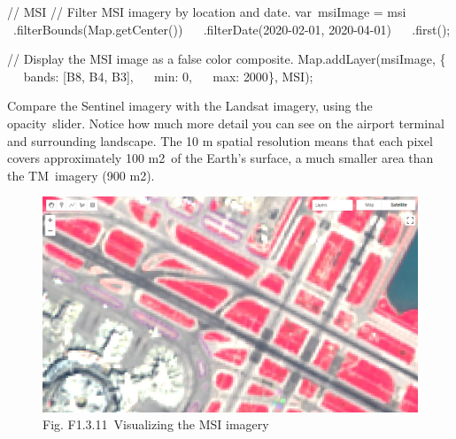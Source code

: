 \documentclass[
  letterpaper,
  DIV=11,
  numbers=noendperiod]{scrreprt}
\newenvironment{Shaded}{\begin{snugshade}}{\end{snugshade}}
\newcommand{\AttributeTok}[1]{\textcolor[rgb]{0.40,0.45,0.13}{#1}}
\newcommand{\BuiltInTok}[1]{\textcolor[rgb]{0.00,0.23,0.31}{#1}}
\newcommand{\CommentTok}[1]{\textcolor[rgb]{0.37,0.37,0.37}{#1}}
\newcommand{\DataTypeTok}[1]{\textcolor[rgb]{0.68,0.00,0.00}{#1}}
\newcommand{\DecValTok}[1]{\textcolor[rgb]{0.68,0.00,0.00}{#1}}
\newcommand{\FunctionTok}[1]{\textcolor[rgb]{0.28,0.35,0.67}{#1}}
\newcommand{\NormalTok}[1]{\textcolor[rgb]{0.00,0.23,0.31}{#1}}
\newcommand{\OperatorTok}[1]{\textcolor[rgb]{0.37,0.37,0.37}{#1}}
\newcommand{\StringTok}[1]{\textcolor[rgb]{0.13,0.47,0.30}{#1}}
\begin{document}
\begin{Shaded}
\begin{Highlighting}[]
\CommentTok{// MSI  }
\CommentTok{// Filter MSI imagery by location and date.  }
\NormalTok{var msiImage }\OperatorTok{=}\NormalTok{ msi  }\AttributeTok{ }\OperatorTok{.}\FunctionTok{filterBounds}\NormalTok{(}\BuiltInTok{Map}\OperatorTok{.}\FunctionTok{getCenter}\NormalTok{())  }
  \AttributeTok{ }\OperatorTok{.}\FunctionTok{filterDate}\NormalTok{(}\StringTok{\textquotesingle{}2020{-}02{-}01\textquotesingle{}}\OperatorTok{,} \StringTok{\textquotesingle{}2020{-}04{-}01\textquotesingle{}}\NormalTok{)  }
  \AttributeTok{ }\OperatorTok{.}\FunctionTok{first}\NormalTok{()}\OperatorTok{;}  
  
\CommentTok{// Display the MSI image as a false color composite.  }
\BuiltInTok{Map}\OperatorTok{.}\FunctionTok{addLayer}\NormalTok{(msiImage}\OperatorTok{,}\NormalTok{ \{  }
  \DataTypeTok{ bands}\OperatorTok{:}\NormalTok{ [}\StringTok{\textquotesingle{}B8\textquotesingle{}}\OperatorTok{,} \StringTok{\textquotesingle{}B4\textquotesingle{}}\OperatorTok{,} \StringTok{\textquotesingle{}B3\textquotesingle{}}\NormalTok{]}\OperatorTok{,}  
  \DataTypeTok{ min}\OperatorTok{:} \DecValTok{0}\OperatorTok{,}  
  \DataTypeTok{ max}\OperatorTok{:} \DecValTok{2000}\NormalTok{\}}\OperatorTok{,} \StringTok{\textquotesingle{}MSI\textquotesingle{}}\NormalTok{)}\OperatorTok{;}
\end{Highlighting}
\end{Shaded}

Compare the Sentinel imagery with the Landsat imagery, using the
opacity~slider. Notice how much more detail you can see on the airport
terminal and surrounding landscape. The 10 m spatial resolution means
that each pixel covers approximately 100 m2~of the Earth's surface, a
much smaller area than the TM~imagery (900 m2).

\begin{figure}

{\centering \includegraphics{./F1/image1.png}

}

\caption{Fig. F1.3.11~Visualizing the MSI imagery}

\end{figure}
\end{document}
